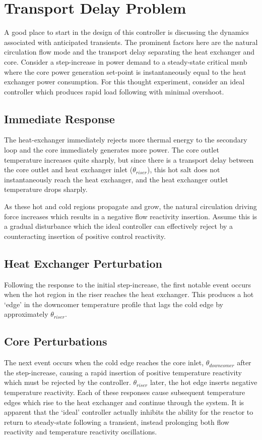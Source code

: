 \section{Transport Delay Problem}

A good place to start in the design of this controller is discussing the dynamics associated with anticipated transients. The prominent factors here are the natural circulation flow mode and the transport delay separating the heat exchanger and core. Consider a step-increase in power demand to a steady-state critical \acs{msnb} where the core power generation set-point is instantaneously equal to the heat exchanger power consumption. For this thought experiment, consider an ideal controller which produces rapid load following with minimal overshoot.

\subsection{Immediate Response}
The heat-exchanger immediately rejects more thermal energy to the secondary loop and the core immediately generates more power. The core outlet temperature increases quite sharply, but since there is a transport delay between the core outlet and heat exchanger inlet ($\theta_{riser}$), this hot salt does not instantaneously reach the heat exchanger, and the heat exchanger outlet temperature drops sharply. 

As these hot and cold regions propagate and grow, the natural circulation driving force increases which results in a negative flow reactivity insertion. Assume this is a gradual disturbance which the ideal controller can effectively reject by a counteracting insertion of positive control reactivity. 

\subsection{Heat Exchanger Perturbation}
Following the response to the initial step-increase, the first notable event occurs when the hot region in the riser reaches the heat exchanger. This produces a hot `edge' in the downcomer temperature profile that lags the cold edge by approximately $\theta_{riser}$.

\subsection{Core Perturbations}
The next event occurs when the cold edge reaches the core inlet, $\theta_{downcomer}$ after the step-increase, causing a rapid insertion of positive temperature reactivity which must be rejected by the controller. $\theta_{riser}$ later, the hot edge inserts negative temperature reactivity. Each of these responses cause subsequent temperature edges which rise to the heat exchanger and continue through the system. It is apparent that the `ideal' controller actually inhibits the ability for the reactor to return to steady-state following a transient, instead prolonging both flow reactivity and temperature reactivity oscillations.

